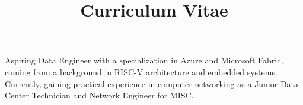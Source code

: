 \documentclass[a4paper,skipsamekey,11pt,english]{curve}
\title{Curriculum Vitae}
\begin{document}
\makeheaders[c]

\vspace{-2.5cm}
\begin{minipage}{0.66\textwidth}
Aspiring Data Engineer with a specialization in Azure and Microsoft Fabric,
coming from a background in RISC-V architecture and embedded systems.
Currently, gaining practical experience in computer networking as a Junior Data Center Technician and Network Engineer
 for MISC.
\end{minipage}
\vspace{0.5cm}






% 
\end{document}
